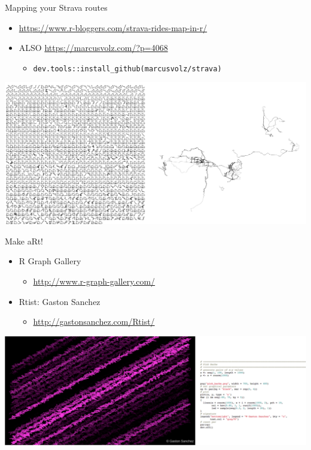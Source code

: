 \documentclass[
  ignorenonframetext,
]{beamer}
\providecommand{\tightlist}{%
  \setlength{\itemsep}{0pt}\setlength{\parskip}{0pt}}
\begin{document}
\begin{frame}[fragile]{Mapping your Strava routes}
\protect\hypertarget{mapping-your-strava-routes}{}

\begin{itemize}
\tightlist
\item
  \url{https://www.r-bloggers.com/strava-rides-map-in-r/}
\item
  ALSO \url{https://marcusvolz.com/?p=4068}

  \begin{itemize}
  \tightlist
  \item
    \texttt{dev.tools::install\_github(marcusvolz/strava)}
  \end{itemize}
\end{itemize}

\includegraphics{../external/images/funR_4_strava_combo.png}

\end{frame}

\begin{frame}{Make aRt!}
\protect\hypertarget{make-art}{}

\begin{itemize}
\tightlist
\item
  R Graph Gallery

  \begin{itemize}
  \tightlist
  \item
    \url{http://www.r-graph-gallery.com/}
  \end{itemize}
\item
  Rtist: Gaston Sanchez

  \begin{itemize}
  \tightlist
  \item
    \url{http://gastonsanchez.com/Rtist/}
  \end{itemize}
\end{itemize}

\includegraphics{../external/images/funR_5_aRt_pink_combo.png}

\end{frame}
\end{document}
